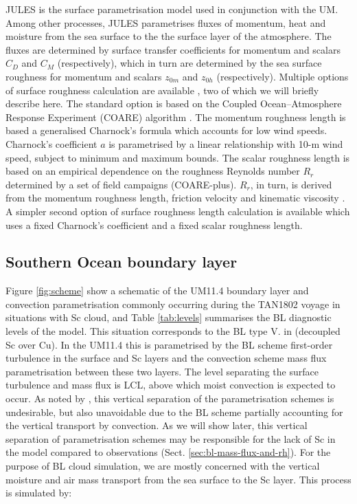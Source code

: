 JULES is the surface parametrisation model used in conjunction with the UM.
Among other processes, JULES parametrises fluxes of momentum, heat and moisture from
the sea surface to the the surface layer of the atmosphere. The fluxes are
determined by surface transfer coefficients for momentum and scalars $C_D$ and
$C_M$ (respectively), which in turn are determined by the sea surface roughness
for momentum and scalars $z_{0m}$ and $z_{0h}$ (respectively). Multiple options
of surface roughness calculation are available \citep{umdp024}, two of which we will briefly
describe here. The standard option is based on the
Coupled Ocean--Atmosphere Response Experiment (COARE) algorithm
\citep{fairall2003}. The momentum roughness length is based
a generalised Charnock's formula which accounts for low wind speeds.
Charnock's coefficient $a$ is parametrised by a linear
relationship with 10-m wind speed, subject to minimum and maximum bounds.
The scalar roughness length is based on an empirical dependence on the
roughness Reynolds number $R_r$ determined by a set of field campaigns (COARE-plus).
$R_r$, in turn, is derived from the momentum roughness length, friction velocity
and kinematic viscosity \citep{fairall2003}.
A simpler second option of surface roughness length calculation is available
which uses a fixed Charnock's coefficient and a fixed scalar roughness length.

\subsection{Southern Ocean boundary layer}
\label{sec:schemes}

Figure \ref{fig:scheme} show a schematic of the UM11.4 boundary layer and convection
parametrisation
commonly occurring during the TAN1802 voyage in situations with Sc cloud,
and Table \ref{tab:levels} summarises the BL diagnostic levels of the model.
This situation corresponds to the BL type V. in \cite{lock2000} (decoupled Sc over Cu).
In the UM11.4 this is parametrised by the BL scheme first-order turbulence
in the surface and Sc layers and the convection scheme mass flux parametrisation
between these two layers. The level separating the surface turbulence and
mass flux is LCL, above which moist convection is expected to occur.
As noted by \cite{lock2000}, this vertical separation of the parametrisation
schemes is undesirable, but also unavoidable due to the BL scheme partially
accounting for the vertical transport by convection. As we will show later,
this vertical separation of parametrisation schemes may be responsible for the
lack of Sc in the model compared to observations (Sect. \ref{sec:bl-mass-flux-and-rh}). For the purpose of BL
cloud simulation, we are mostly concerned with the vertical moisture and air
mass transport from the sea surface to the Sc layer. This process is simulated
by:

